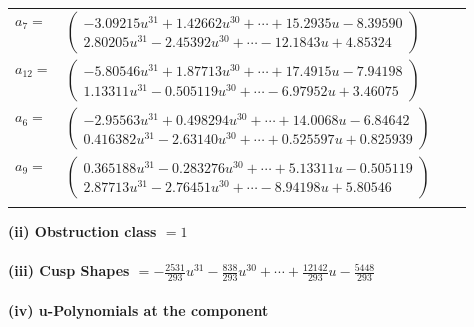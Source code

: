 \documentclass[1p]{elsarticle_modified}
\theoremstyle{definition}
\begin{document}
\begin{tabular}{m{7pt} m{180pt} m{7pt} m{180pt} }
\flushright $a_{7}=$&$\begin{pmatrix}-3.09215 u^{31}+1.42662 u^{30}+\cdots+15.2935 u-8.39590\\2.80205 u^{31}-2.45392 u^{30}+\cdots-12.1843 u+4.85324\end{pmatrix}$ \\
\flushright $a_{12}=$&$\begin{pmatrix}-5.80546 u^{31}+1.87713 u^{30}+\cdots+17.4915 u-7.94198\\1.13311 u^{31}-0.505119 u^{30}+\cdots-6.97952 u+3.46075\end{pmatrix}$ \\
\flushright $a_{6}=$&$\begin{pmatrix}-2.95563 u^{31}+0.498294 u^{30}+\cdots+14.0068 u-6.84642\\0.416382 u^{31}-2.63140 u^{30}+\cdots+0.525597 u+0.825939\end{pmatrix}$ \\
\flushright $a_{9}=$&$\begin{pmatrix}0.365188 u^{31}-0.283276 u^{30}+\cdots+5.13311 u-0.505119\\2.87713 u^{31}-2.76451 u^{30}+\cdots-8.94198 u+5.80546\end{pmatrix}$\\&\end{tabular}
\flushleft \textbf{(ii) Obstruction class $= 1$}\\~\\
\flushleft \textbf{(iii) Cusp Shapes $= -\frac{2531}{293} u^{31}-\frac{838}{293} u^{30}+\cdots+\frac{12142}{293} u-\frac{5448}{293}$}\\~\\
\newpage\renewcommand{\arraystretch}{1}
\flushleft \textbf{(iv) u-Polynomials at the component}\newline \\
\end{document}
